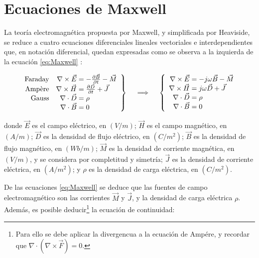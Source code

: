 \section{Ecuaciones de Maxwell}
\label{subsec_ecuaciones_maxwell}
La teoría electromagnética propuesta por Maxwell, y simplificada por Heaviside, se reduce a cuatro ecuaciones diferenciales lineales vectoriales e interdependientes que, en notación diferencial, quedan expresadas como se observa a la izquierda de la ecuación \ref{eq:Maxwell} \cite{Pozar:MwEngineering}:

\begin{align}
\label{eq:Maxwell}
\left.\begin{array}{rr@{\mskip\thickmuskip}l}
\text{Faraday} &\nabla \times \vec{E} & = -\frac{\partial \vec{B}}{\partial t} - \vec{M}\\
\text{Ampère} &\nabla \times \vec{H} & = \frac{\partial \vec{D}}{\partial t} + \vec{J} \\
\text{Gauss} &\nabla \cdot \vec{D} & = \rho \\
& \nabla \cdot \vec{B} & = 0
\end{array} \right\}
\quad \implies \quad
\left\{\begin{array}{r@{\mskip\thickmuskip}l}
\nabla \times \vec{E} & = -j \omega \vec{B} - \vec{M} \\
\nabla \times \vec{H} & = j \omega \vec{D} + \vec{J} \\
\nabla \cdot \vec{D} & = \rho\\
\nabla \cdot \vec{B} & = 0
\end{array}\right.
\end{align}

donde $\vec{E}$ es el campo eléctrico, en $(V/m)$; $\vec{H}$ es el campo magnético, en $(A/m)$; $\vec{D}$ es la densidad de flujo eléctrico, en $(C/m^2)$; $\vec{B}$ es la densidad de flujo magnético, en $(Wb/m)$; $\vec{M}$ es la densidad de corriente magnética, en $(V/m)$, y se considera por completitud y simetría; $\vec{J}$ es la densidad de corriente eléctrica, en $(A/m^2)$; y $\rho$ es la densidad de carga eléctrica, en $(C/m^2)$.

De las ecuaciones \ref{eq:Maxwell} se deduce que las fuentes de campo electromagnético son las corrientes $\vec{M}$ y $\vec{J}$, y la densidad de carga eléctrica $\rho$. Además, es posible deducir\footnote{Para ello se debe aplicar la divergencua a la ecuación de Ampére, y recordar que $\nabla \cdot (\nabla \times \vec{F}) = 0$.} la ecuación de continuidad:

